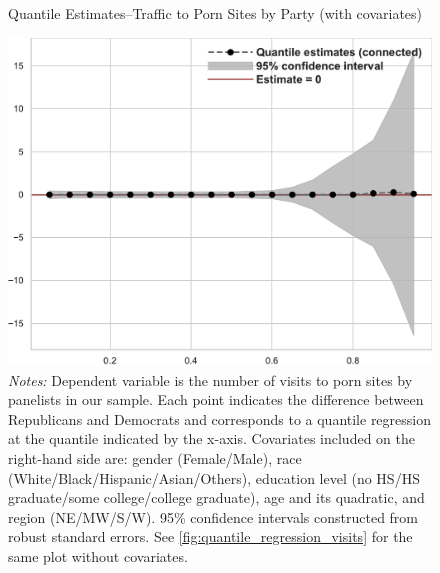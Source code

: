 \documentclass[12pt, letterpaper]{article}
\begin{document}
\begin{figure}
	\centering
	\caption{Quantile Estimates--Traffic to Porn Sites by Party (with covariates)}
	\includegraphics[width=.55\linewidth]{../figs/quantile_reg_covariates_visits_adult.pdf}
	\caption*{\footnotesize \emph{Notes:} 
		Dependent variable is the number of visits to porn sites by panelists in our sample.
		Each point indicates the difference between Republicans and Democrats and corresponds to a quantile regression at the quantile indicated by the x-axis.
		Covariates included on the right-hand side are: gender (Female/Male), race (White/Black/Hispanic/Asian/Others), education level (no HS/HS graduate/some college/college graduate), age and its quadratic, and region (NE/MW/S/W).
		95\% confidence intervals constructed from robust standard errors.
		See \cref{fig:quantile_regression_visits} for the same plot without covariates.
	}
	\label{fig:quantile_regression_visits_covariates}
\end{figure}
\end{document}
